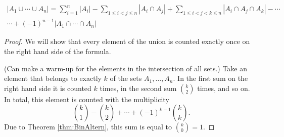 \begin{page}
\setcounter{section}{5}
\setcounter{subsection}{1}
\setcounter{dfn}{1}
\label{portion:151}

\begin{thm}
\label{thm:IncExc}
\begin{multline*}
|A_1 \cup \cdots \cup A_n| = \sum_{i=1}^n |A_i| - \sum_{1 \le i < j \le n} |A_i \cap A_j| 
+ \sum_{1 \le i < j < k \le n} |A_i \cap A_j \cap A_k| - \cdots \\
\cdots +(-1)^{n-1} |A_1 \cap \cdots \cap A_n|
\end{multline*}
\end{thm}

\end{page}

\begin{page}
\setcounter{section}{5}
\setcounter{subsection}{1}
\setcounter{dfn}{1}
\label{portion:152}

\begin{proof}
We will show that every element of the union is counted exactly once on the right hand side of the formula.

(Can make a warm-up for the elements in the intersection of all sets.)
Take an element that belongs to exactly $k$ of the sets $A_1, \ldots, A_n$.
In the first sum on the right hand side it is counted $k$ times,
in the second sum $\binom{k}{2}$ times, and so on.
In total, this element is counted with the multiplicity
\[
\binom{k}{1} - \binom{k}{2} + \cdots + (-1)^{k-1}\binom{k}{k}.
\]
Due to Theorem \ref{thm:BinAltern}, this sum is equal to $\binom{k}{0} = 1$.
\end{proof}


\end{page}

